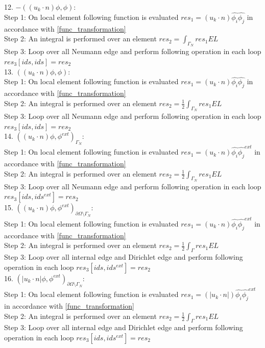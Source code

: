 \documentclass[a4paper,12pt]{book}
\begin{document}
12. $-((u_k \cdot n)\phi , \phi)$:\\
Step 1: On local element following function is evaluated $res_1 = (u_k \cdot n) \hat{\phi_i} \hat{\phi_j} $ in accordance with \ref{func_transformation}\\
Step 2: An integral is performed over an element $res_2= \int_{\Gamma_N} res_1 EL $\\
Step 3: Loop over all Neumann edge and perform following operation in each loop $res_3[ids,ids]=res_2$\\

13. $((u_k \cdot n)\phi , \phi)$:\\
Step 1: On local element following function is evaluated $res_1 = (u_k \cdot n) \hat{\phi_i} \hat{\phi_j} $ in accordance with \ref{func_transformation}\\
Step 2: An integral is performed over an element $res_2 = \frac{1}{2}  \int_{\Gamma_N} res_1 EL $\\
Step 3: Loop over all Neumann edge and perform following operation in each loop $res_3[ids,ids] = res_2$\\

14. $((u_k \cdot n)\phi,\phi^{ext})_{\Gamma_N}$:\\
Step 1: On local element following function is evaluated $res_1 = (u_k \cdot n) \hat{\phi_i} \hat{\phi_j}^{ext} $ in accordance with \ref{func_transformation}\\
Step 2: An integral is performed over an element $res_2 = \frac{1}{2} \int_{\Gamma_N} res_1 EL $\\
Step 3: Loop over all Neumann edge and perform following operation in each loop $res_3[ids,ids^{ext}] = res_2$\\

15. $((u_k \cdot n)\phi,\phi^{ext})_{\partial \Omega \setminus \Gamma_N}$:\\
Step 1: On local element following function is evaluated $res_1 = (u_k \cdot n) \hat{\phi_i} \hat{\phi_j}^{ext} $ in accordance with \ref{func_transformation}\\
Step 2: An integral is performed over an element $res_2 = \frac{1}{2} \int_{\Gamma} res_1 EL $\\
Step 3: Loop over all internal edge and Dirichlet edge and perform following operation in each loop $res_3[ids,ids^{ext}] = res_2$\\

16. $(|u_k \cdot n| \phi,\phi^{ext})_{\partial \Omega \setminus \Gamma_N}$:\\
Step 1: On local element following function is evaluated $res_1 = (|u_k \cdot n|) \hat{\phi_i} \hat{\phi_j}^{ext} $ in accordance with \ref{func_transformation}\\
Step 2: An integral is performed over an element $res_2 = \frac{1}{2} \int_{\Gamma} res_1 EL $\\
Step 3: Loop over all internal edge and Dirichlet edge and perform following operation in each loop $res_3[ids,ids^{ext}] = res_2$\\
\end{document}
